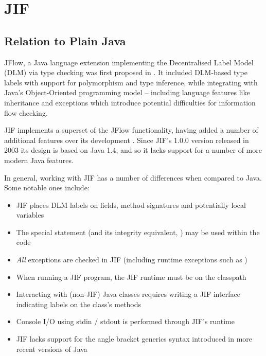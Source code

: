 \section{JIF}

\subsection{Relation to Plain Java}

JFlow, a Java language extension implementing the Decentralised Label Model (DLM) via type checking was first proposed in  \cite{myers1999jflow}. It included DLM-based type labels with support for polymorphism and type inference, while integrating with Java's Object-Oriented programming model -- including language features like inheritance and exceptions which introduce potential difficulties for information flow checking.

JIF implements a superset of the JFlow functionality, having added a number of additional features over its development \cite{jifwebsite}. Since JIF's 1.0.0 version released in 2003 its design is based on Java 1.4, and so it lacks support for a number of more modern Java features.

In general, working with JIF has a number of differences when compared to Java. Some notable ones include:

\begin{itemize}
	\item JIF places DLM labels on fields, method signatures and potentially local variables
	
	\item The special  statement (and its integrity equivalent, ) may be used within the code
	
	\item \textit{All} exceptions are checked in JIF (including runtime exceptions such as )
	
	\item When running a JIF program, the JIF runtime must be on the classpath
	
	\item Interacting with (non-JIF) Java classes requires writing a JIF interface indicating labels on the class's methods
	
	\item Console I/O using stdin / stdout is performed through JIF's runtime
	
	\item JIF lacks support for the angle bracket generics syntax introduced in more recent versions of Java
\end{itemize}

